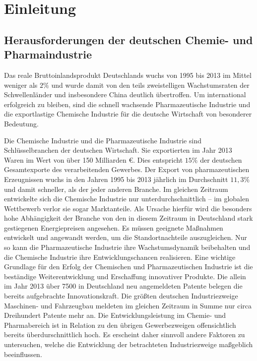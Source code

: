 \chapter{Einleitung}\label{ch:einleitung}
\section{Herausforderungen der deutschen Chemie- und Pharmaindustrie}\label{sec:einltg_chemPharmaIndustrie}
Das reale Bruttoinlandsprodukt Deutschlands wuchs von 1995 bis 2013 im Mittel weniger als $2\%$ und wurde damit von den teils zweistelligen Wachstumsraten der Schwellenl\"ander und insbesondere China deutlich \"ubertroffen. Um international erfolgreich zu bleiben, sind die schnell wachsende Pharmazeutische Industrie und die exportlastige Chemische Industrie f\"ur die deutsche Wirtschaft von besonderer Bedeutung. \hfill \newline

Die Chemische Industrie und die Pharmazeutische Industrie sind Schl\"usselbranchen der deutschen Wirtschaft. Sie exportierten im Jahr 2013 Waren im Wert von \"uber 150 Milliarden \euro. Dies entspricht $15 \%$ der deutschen Gesamtexporte des verarbeitenden Gewerbes. Der Export von pharmazeutischen Erzeugnissen wuchs in den Jahren 1995 bis 2013 j\"ahrlich im Durchschnitt $11,3 \%$ und damit schneller, als der jeder anderen Branche. Im gleichen Zeitraum entwickelte sich die Chemische Industrie nur unterdurchschnittlich -- im globalen Wettbewerb verlor sie sogar Marktanteile. Als Ursache hierf\"ur wird die besonders hohe Abh\"angigkeit der Branche von den in diesem Zeitraum in Deutschland stark gestiegenen Energiepreisen angesehen. Es m\"ussen geeignete Ma\ss{}nahmen entwickelt und angewandt werden, um die Standortnachteile auszugleichen. Nur so kann die Pharmazeutische Industrie ihre Wachstumsdynamik beibehalten und die Chemische Industrie ihre Entwicklungschancen realisieren. \hfill \newline
Eine wichtige Grundlage f\"ur den Erfolg der Chemischen und Pharmazeutischen Industrie ist die best\"andige Weiterentwicklung und Erschaffung innovativer Produkte. Die allein im Jahr 2013 \"uber 7500 in Deutschland neu angemeldeten Patente belegen die bereits aufgebrachte Innovationskraft. Die gr\"o\ss{}ten deutschen Industriezweige Maschinen- und Fahrzeugbau meldeten im gleichen Zeitraum in Summe nur circa Dreihundert Patente mehr an. Die Entwicklungsleistung im Chemie- und Pharmabereich ist in Relation zu den \"ubrigen Gewerbezweigen offensichtlich bereits \"uberdurschnittlich hoch. Es erscheint daher sinnvoll andere Faktoren zu untersuchen, welche die Entwicklung der betrachteten Industriezweige ma\ss{}geblich beeinflussen. \cite{PerspektiveD_2016} \hfill \newline


